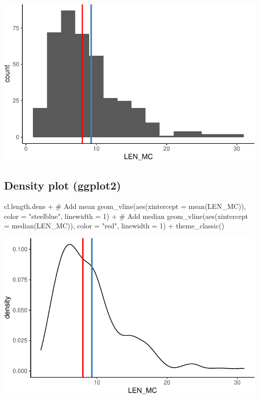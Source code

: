 \documentclass[
  11pt,
  letterpaper,
  DIV=11,
  numbers=noendperiod]{scrreprt}
\newenvironment{Shaded}{\begin{snugshade}}{\end{snugshade}}
\newcommand{\AttributeTok}[1]{\textcolor[rgb]{0.40,0.45,0.13}{#1}}
\newcommand{\CommentTok}[1]{\textcolor[rgb]{0.37,0.37,0.37}{#1}}
\newcommand{\DecValTok}[1]{\textcolor[rgb]{0.68,0.00,0.00}{#1}}
\newcommand{\FunctionTok}[1]{\textcolor[rgb]{0.28,0.35,0.67}{#1}}
\newcommand{\NormalTok}[1]{\textcolor[rgb]{0.00,0.23,0.31}{#1}}
\newcommand{\SpecialCharTok}[1]{\textcolor[rgb]{0.37,0.37,0.37}{#1}}
\newcommand{\StringTok}[1]{\textcolor[rgb]{0.13,0.47,0.30}{#1}}
\begin{document}
\includegraphics{Summary_statistics_files/figure-pdf/unnamed-chunk-10-1.pdf}

\subsection{Density plot (ggplot2)}

\begin{Shaded}
\begin{Highlighting}[]
\NormalTok{cl.length.dens }\SpecialCharTok{+}
  \CommentTok{\# Add mean}
  \FunctionTok{geom\_vline}\NormalTok{(}\FunctionTok{aes}\NormalTok{(}\AttributeTok{xintercept =} \FunctionTok{mean}\NormalTok{(LEN\_MC)), }\AttributeTok{color =} \StringTok{"steelblue"}\NormalTok{, }\AttributeTok{linewidth =} \DecValTok{1}\NormalTok{) }\SpecialCharTok{+}
  \CommentTok{\# Add median}
  \FunctionTok{geom\_vline}\NormalTok{(}\FunctionTok{aes}\NormalTok{(}\AttributeTok{xintercept =} \FunctionTok{median}\NormalTok{(LEN\_MC)), }\AttributeTok{color =} \StringTok{"red"}\NormalTok{, }\AttributeTok{linewidth =} \DecValTok{1}\NormalTok{) }\SpecialCharTok{+}
  \FunctionTok{theme\_classic}\NormalTok{()}
\end{Highlighting}
\end{Shaded}

\includegraphics{Summary_statistics_files/figure-pdf/unnamed-chunk-11-1.pdf}
\end{document}
